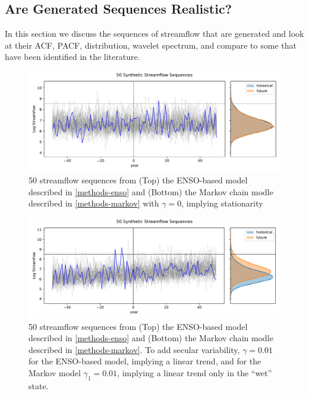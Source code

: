 \documentclass[12pt]{article}
\begin{document}
\subsection{Are Generated Sequences Realistic?\label{sec:sequence-realistic}}

In this section we discuss the sequences of streamflow that are generated and look at their ACF, PACF, distribution, wavelet spectrum, \etc{} and compare to some that have been identified in the literature.

\begin{figure}[ht]
  \includegraphics[width=\textwidth]{../../figs/stationary_sequences.pdf}  
  \caption{50 streamflow sequences from (Top) the ENSO-based model described in \cref{methods-enso} and (Bottom) the Markov chain modle described in \cref{methods-markov} with \(\gamma=0\), implying stationarity\label{fig:stationary-sequences}}
\end{figure}

\begin{figure}[ht]
  \includegraphics[width=\textwidth]{../../figs/trend_sequences.pdf}
  \caption{50 streamflow sequences from (Top) the ENSO-based model described in \cref{methods-enso} and (Bottom) the Markov chain modle described in \cref{methods-markov}. To add secular variability, \(\gamma=0.01\) for the ENSO-based model, implying a linear trend, and for the Markov model \(\gamma_1 = 0.01\), implying a linear trend only in the ``wet'' state.\label{fig:trend-sequences}}
\end{figure}
\end{document}
